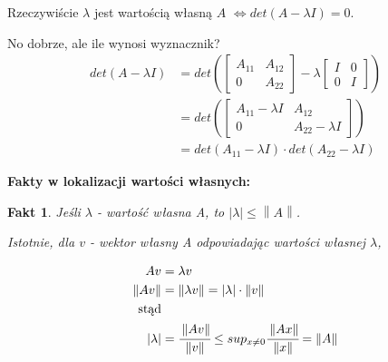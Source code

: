 \documentclass[hidelinks,a4paper,fleqn,oneside]{book}
\newcommand{\norm}[1]{\left\lVert#1\right\rVert}
\newtheorem{fakt}{Fakt}
\begin{document}
Rzeczywiście $\lambda$ jest wartością własną $A$ $\iff det(A -\lambda I) = 0$.

No dobrze, ale ile wynosi wyznacznik?
\begin{equation}
	\begin{aligned}
		det(A - \lambda I) & = det\left( \left[\begin{array}{c|c}A_{11} & A_{12} \\ \hline 0 & A_{22}\end{array}\right] - \lambda  \left[\begin{array}{c|c}I & 0 \\ \hline 0 & I\end{array}\right] \right) \\
		& = det\left( \left[\begin{array}{c|c}A_{11}-\lambda I & A_{12} \\ \hline 0 & A_{22} - \lambda I\end{array}\right]\right) \\
		& = det(A_{11} - \lambda I) \cdot det(A_{22} - \lambda I)
	\end{aligned}
\end{equation}

\textbf{Fakty w lokalizacji wartości własnych:}

\begin{fakt}
	Jeśli $\lambda$ - wartość własna A, to $|\lambda| \leq \norm{A}$.
		
	Istotnie, dla $v$ - wektor własny A odpowiadając wartości własnej $\lambda$,
		
	\begin{equation}
		\begin{aligned}
			Av             & =\lambda v                                                                                   \\
			\norm{A v}    & = \norm{\lambda v} = |\lambda| \cdot \norm{v}                                              \\
			\textrm{stąd} &                                                                                              \\
			|\lambda|      & = \cfrac{\norm{A v}}{\norm{v}} \leq sup_{x \neq 0} \cfrac{\norm{Ax}}{\norm{x}} = \norm{A} 
		\end{aligned}
	\end{equation}
		
\end{fakt}
\end{document}
